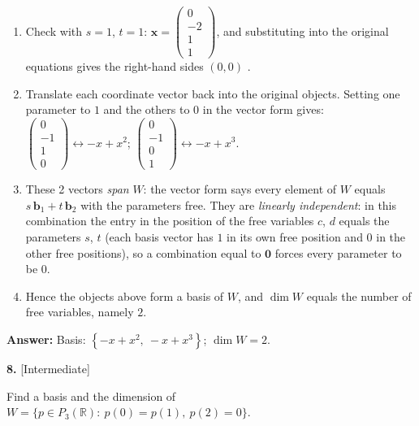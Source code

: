 \documentclass[11pt]{article}
\begin{document}
\begin{tcolorbox}[breakable,colback=ans,colframe=ansb,boxrule=0.5pt,left=4pt,right=4pt,top=2pt,bottom=2pt]
\begin{enumerate}[leftmargin=3.1em,itemsep=1pt,topsep=1pt,label=\textbf{Step \arabic*.}]
\item Check with $s=1$, $t=1$: $\mathbf x=\begin{pmatrix}0\\-2\\1\\1\end{pmatrix}$, and substituting into the original equations gives the right-hand sides $(0,0)$ \checkmark.
\item Translate each coordinate vector back into the original objects. Setting one parameter to $1$ and the others to $0$ in the vector form gives: $\begin{pmatrix}0\\-1\\1\\0\end{pmatrix}\leftrightarrow -x+x^{2}$; $\begin{pmatrix}0\\-1\\0\\1\end{pmatrix}\leftrightarrow -x+x^{3}$.
\item These 2 vectors \emph{span} $W$: the vector form says every element of $W$ equals $s\,\mathbf b_1+t\,\mathbf b_2$ with the parameters free. They are \emph{linearly independent}: in this combination the entry in the position of the free variables $c$, $d$ equals the parameters $s$, $t$ (each basis vector has $1$ in its own free position and $0$ in the other free positions), so a combination equal to $\mathbf 0$ forces every parameter to be $0$.
\item Hence the objects above form a basis of $W$, and $\dim W$ equals the number of free variables, namely $2$.
\end{enumerate}\textbf{Answer:} Basis: $\left\{-x+x^{2},\ -x+x^{3}\right\}$; $\dim W=2$.\end{tcolorbox}
\par\vspace{2pt}
\begin{minipage}{\linewidth}\textbf{8.} \hfill{\scriptsize\color{ink}[Intermediate]}\par\nopagebreak Find a basis and the dimension of $W=\{p\in P_3(\mathbb{R}):\ p(0)=p(1),\ p(2)=0\}$.
\end{minipage}\par\nopagebreak
\end{document}
